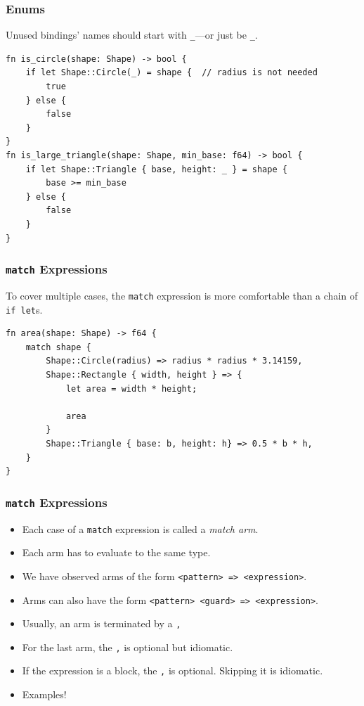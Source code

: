 \begin{frame}[fragile]
    \frametitle{Enums}
    Unused bindings' names should start with \texttt{\_}---or just be \texttt{\_}.
    \pause
    \vfill
    \begin{verbatim}
fn is_circle(shape: Shape) -> bool {
    if let Shape::Circle(_) = shape {  // radius is not needed
        true
    } else {
        false
    }
}
fn is_large_triangle(shape: Shape, min_base: f64) -> bool {
    if let Shape::Triangle { base, height: _ } = shape {
        base >= min_base
    } else {
        false
    }
}
    \end{verbatim}
\end{frame}

\begin{frame}[fragile]
    \frametitle{\texttt{match} Expressions}
    To cover multiple cases, the \texttt{match} expression is more comfortable than a chain of \texttt{if let}s.
    \pause
    \vfill
    \begin{verbatim}
fn area(shape: Shape) -> f64 {
    match shape {
        Shape::Circle(radius) => radius * radius * 3.14159,
        Shape::Rectangle { width, height } => {
            let area = width * height;

            area
        }
        Shape::Triangle { base: b, height: h} => 0.5 * b * h,
    }
}
    \end{verbatim}
\end{frame}

\begin{frame}[fragile]
    \frametitle{\texttt{match} Expressions}
    \begin{itemize}
        \item Each case of a \texttt{match} expression is called a \textit{match arm}.
        \item Each arm has to evaluate to the same type.
        \pause
        \vfill
        \vspace{.5cm}
        \item We have observed arms of the form \texttt{<pattern> => <expression>}.
        \item Arms can also have the form \texttt{<pattern> <guard> => <expression>}.
        \pause
        \vfill
        \vspace{.5cm}
        \item Usually, an arm is terminated by a \texttt{,}
        \item For the last arm, the \texttt{,} is optional but idiomatic.
        \item If the expression is a block, the \texttt{,} is optional. Skipping it is idiomatic.
        \pause
        \vfill
        \vspace{.5cm}
        \item Examples!
    \end{itemize}
\end{frame}

